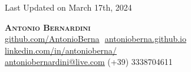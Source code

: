 \documentclass[letterpaper,11pt]{article}
\makeatletter
\newcommand{\resumeProjectHeading}[2]{
    \item
    \begin{tabular*}{0.97\textwidth}{l@{\extracolsep{\fill}}r}
      \small#1 & #2 \\
    \end{tabular*}\vspace{-7pt}
}
\newcommand{\resumeSubHeadingListStart}{\begin{itemize}[leftmargin=0.15in, label={}]}
\makeatother
\begin{document}
\begin{flushright}
  \color{gray}
  \item
  Last Updated on March 17th, 2024
\end{flushright}

\vspace{-5pt}

\begin{center}
    \textbf{\Huge \scshape Antonio Bernardini} \\ \vspace{8pt}
    \small
    \href{https://github.com/AntonioBerna}{\underline{github.com/AntonioBerna}} $  $
    \href{https://antonioberna.github.io}
    {\underline{antonioberna.github.io}} $  $
    \href{https://www.linkedin.com/in/antonioberna/}{\underline{linkedin.com/in/antonioberna/}} $  $ \\
    \href{mailto:antoniobernardini@live.com}
    {\underline{antoniobernardini@live.com}}
     (+39) 3338704611
\end{center}





          
\end{document}
